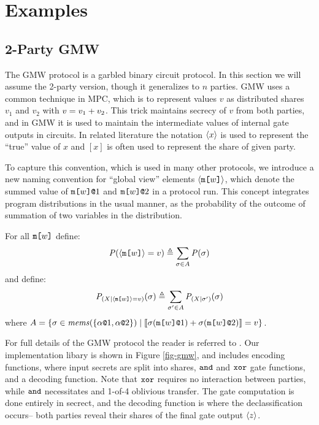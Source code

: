 \section{Examples}
\label{section-examples}

\subsection{2-Party GMW}
\label{section-metalang-gmw}



The GMW protocol is a garbled binary circuit protocol. In this section
we will assume the 2-party version, though it generalizes to $n$
parties\cite{XXX}. GMW uses a common technique in MPC, which is to
represent values $v$ as distributed shares $v_1$ and $v_2$ with
$v = v_1 + v_2$. This trick maintains secrecy of $v$
from both parties, and in GMW it is used to maintain the intermediate
values of internal gate outputs in circuits. In related literature
the notation $\langle x \rangle$ is used to represent the ``true''
value of $x$ and $[x]$ is often used to represent the share of
given party.

To capture this convention, which is used in many other protocols, we
introduce a new naming convention for ``global view'' elements
$\langle \texttt{m[}w\texttt{]} \rangle$, which denote the summed value of
$\texttt{m[}w\texttt{]}\texttt{@}1$ and $\texttt{m[}w\texttt{]}\texttt{@}2$ in a protocol
run. This concept integrates program distributions in the
usual manner, as the probability of the outcome of summation
of two variables in the distribution.
\begin{definition}
  For all $\texttt{m[}w\texttt{]}$ define:
  $$\mathit{P}(\langle \texttt{m[}w\texttt{]} \rangle = v) \triangleq \sum_{\sigma \in A} \mathit{P}(\sigma)$$
  and define:
  $$\mathit{P}_{({X}|{\langle \texttt{m[}w\texttt{]} \rangle = v})}(\sigma) \triangleq  \sum_{\sigma' \in A} \mathit{P}_{({X}|{\sigma'})}(\sigma)$$
  where $A = \{ \sigma \in \mathit{mems}(\{ \alpha\texttt{@}1,\alpha\texttt{@}2 \} ) \mid
      \llbracket \sigma(\texttt{m[}w\texttt{]}\texttt{@}1) + \sigma(\texttt{m[}w\texttt{]}\texttt{@}2) \rrbracket = v \}$.
\end{definition}

For full details of the GMW protocol the reader is referred to
\cite{evans2018pragmatic}. Our implementation libary is shown in
Figure \ref{fig-gmw}, and includes encoding functions, where
input secrets are split into shares, $\texttt{and}$ and $\texttt{xor}$ gate
functions, and a decoding function. Note that $\texttt{xor}$ requires
no interaction between parties, while $\texttt{and}$ necessitates and
1-of-4 oblivious transfer. The gate computation is
done entirely in secrect, and the decoding function
is where the declassification occurs-- both parties reveal
their shares of the final gate output $\langle z \rangle$.

